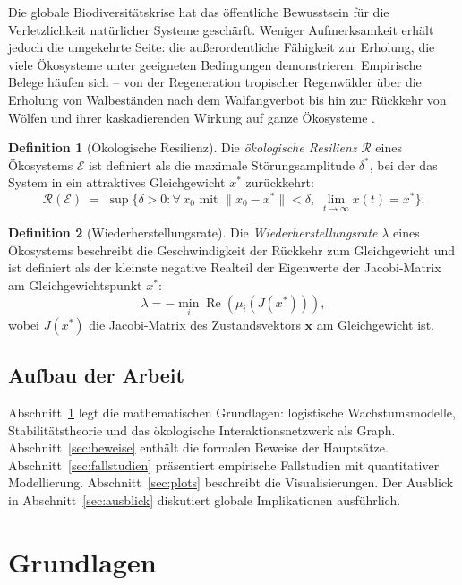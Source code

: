 ﻿\documentclass[a4paper,12pt]{article}
\theoremstyle{definition}
\newtheorem{definition}{Definition}
\begin{document}
Die globale Biodiversitätskrise hat das öffentliche Bewusstsein für die Verletzlichkeit natürlicher Systeme geschärft. Weniger Aufmerksamkeit erhält jedoch die umgekehrte Seite: die außerordentliche Fähigkeit zur Erholung, die viele Ökosysteme unter geeigneten Bedingungen demonstrieren. Empirische Belege häufen sich -- von der Regeneration tropischer Regenwälder über die Erholung von Walbeständen nach dem Walfangverbot bis hin zur Rückkehr von Wölfen und ihrer kaskadierenden Wirkung auf ganze Ökosysteme \cite{ripple2014wolves}.

\begin{definition}[Ökologische Resilienz]
	Die \emph{ökologische Resilienz} $\mathcal{R}$ eines Ökosystems $\mathcal{E}$ ist definiert als die maximale Störungsamplitude $\delta^*$, bei der das System in ein attraktives Gleichgewicht $x^*$ zurückkehrt:
	\[
	\mathcal{R}(\mathcal{E}) \;=\; \sup\bigl\{\delta > 0 : \forall\, x_0 \text{ mit } \|x_0 - x^*\| < \delta,\; \lim_{t\to\infty} x(t) = x^*\bigr\}.
	\]
\end{definition}

\begin{definition}[Wiederherstellungsrate]
	Die \emph{Wiederherstellungsrate} $\lambda$ eines Ökosystems beschreibt die Geschwindigkeit der Rückkehr zum Gleichgewicht und ist definiert als der kleinste negative Realteil der Eigenwerte der Jacobi-Matrix am Gleichgewichtspunkt $x^*$:
	\[
	\lambda = -\min_{i}\operatorname{Re}(\mu_i(J(x^*))),
	\]
	wobei $J(x^*)$ die Jacobi-Matrix des Zustandsvektors $\mathbf{x}$ am Gleichgewicht ist.
\end{definition}

\subsection{Aufbau der Arbeit}

Abschnitt~\ref{sec:grundlagen} legt die mathematischen Grundlagen: logistische Wachstumsmodelle, Stabilitätstheorie und das ökologische Interaktionsnetzwerk als Graph.
Abschnitt~\ref{sec:beweise} enthält die formalen Beweise der Hauptsätze.
Abschnitt~\ref{sec:fallstudien} präsentiert empirische Fallstudien mit quantitativer Modellierung.
Abschnitt~\ref{sec:plots} beschreibt die Visualisierungen.
Der Ausblick in Abschnitt~\ref{sec:ausblick} diskutiert globale Implikationen ausführlich.

\section{Grundlagen}
\label{sec:grundlagen}
\end{document}
